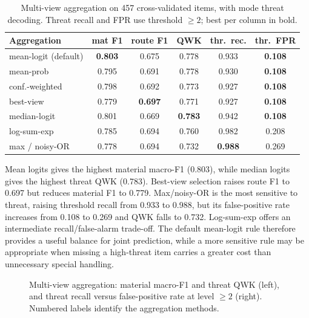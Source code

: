 \begin{table}[!h]
\centering
\caption{Multi-view aggregation on 457 cross-validated items, with mode threat decoding. Threat recall and FPR use threshold $\geq 2$; best per column in bold.}
\label{tab:viewagg}
\footnotesize\setlength{\tabcolsep}{5pt}
\begin{tabular}{lccccc}
\toprule
\textbf{Aggregation} & \textbf{mat F1} & \textbf{route F1} & \textbf{QWK} & \textbf{thr.\ rec.} & \textbf{thr.\ FPR} \\
\midrule
mean-logit (default) & \textbf{0.803} & 0.675 & 0.778 & 0.933 & \textbf{0.108} \\
mean-prob & 0.795 & 0.691 & 0.778 & 0.930 & \textbf{0.108} \\
conf.-weighted & 0.798 & 0.692 & 0.773 & 0.927 & \textbf{0.108} \\
best-view & 0.779 & \textbf{0.697} & 0.771 & 0.927 & \textbf{0.108} \\
median-logit & 0.801 & 0.669 & \textbf{0.783} & 0.942 & \textbf{0.108} \\
log-sum-exp & 0.785 & 0.694 & 0.760 & 0.982 & 0.208 \\
max / noisy-OR & 0.778 & 0.694 & 0.732 & \textbf{0.988} & 0.269 \\
\bottomrule
\end{tabular}
\end{table}

Mean logits gives the highest material macro-F1 (0.803), while median logits gives the highest threat QWK (0.783). Best-view selection raises route F1 to 0.697 but reduces material F1 to 0.779. Max/noisy-OR is the most sensitive to threat, raising threshold recall from 0.933 to 0.988, but its false-positive rate increases from 0.108 to 0.269 and QWK falls to 0.732. Log-sum-exp offers an intermediate recall/false-alarm trade-off. The default mean-logit rule therefore provides a useful balance for joint prediction, while a more sensitive rule may be appropriate when missing a high-threat item carries a greater cost than unnecessary special handling.

\begin{figure}[!ht]
    \centering
    \caption{Multi-view aggregation: material macro-F1 and threat QWK (left), and threat recall versus false-positive rate at level $\geq 2$ (right). Numbered labels identify the aggregation methods.}
    \label{fig:viewagg}
\end{figure}

